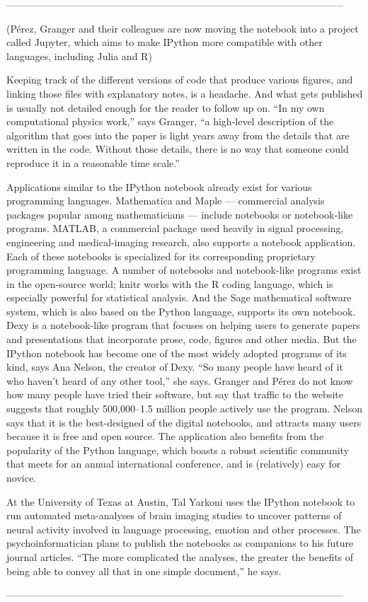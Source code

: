 ------------------------------------------------------------------------------------------------------

(Pérez,
Granger and their colleagues are now moving
the notebook into a project called Jupyter, which
aims to make IPython more compatible with
other languages, including Julia and R)


Keeping track of the different versions of code
that produce various figures, and linking those
files with explanatory notes, is a headache.
And what gets published is usually not detailed
enough for the reader to follow up on. “In my
own computational physics work,” says Granger,
“a high-level description of the algorithm that
goes into the paper is light years away from
the details that are written in the code. Without
those details, there is no way that someone
could reproduce it in a reasonable time scale.”

Applications similar to the IPython notebook
already exist for various programming
languages. Mathematica and Maple — commercial
analysis packages popular among mathematicians
— include notebooks or notebook-like
programs. MATLAB, a commercial package
used heavily in signal processing, engineering
and medical-imaging research, also supports a
notebook application. Each of these notebooks
is specialized for its corresponding proprietary
programming language.
A number of notebooks and notebook-like
programs exist in the open-source world; knitr
works with the R coding language, which is
especially powerful for statistical analysis. And
the Sage mathematical software system, which
is also based on the Python language, supports
its own notebook. Dexy is a notebook-like program
that focuses on helping users to generate
papers and presentations that incorporate prose,
code, figures and other media.
But the IPython notebook has become one
of the most widely adopted programs of its
kind, says Ana Nelson, the creator of Dexy. “So
many people have heard of it who haven’t heard
of any other tool,” she says. Granger and Pérez
do not know how many people have tried their
software, but say that traffic to the website suggests
that roughly 500,000–1.5 million people
actively use the program. Nelson says that it is
the best-designed of the digital notebooks, and
attracts many users because it is free and open
source. The application also benefits from the
popularity of the Python language, which boasts
a robust scientific community that meets for an
annual international conference, and is (relatively)
easy for novice.



At the University of Texas at Austin, Tal Yarkoni
uses the IPython notebook to run automated
meta-analyses of brain imaging studies to
uncover patterns of neural activity involved in
language processing, emotion and other processes.
The psychoinformatician plans to publish
the notebooks as companions to his future
journal articles. “The more complicated the
analyses, the greater the benefits of being able to convey all that in one simple document,” he says.
\cite{shen2014interactive}

------------------------------------------------------------------------------------------------------



